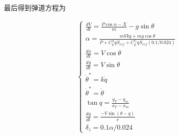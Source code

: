 \documentclass[UTF8]{ctexart}
\begin{document}
最后得到弹道方程为

\begin{align}
    \begin{cases}
        \frac{dV}{dt}=\frac{P\cos\alpha-X}{m}-g\sin\theta                                                     \\
        \alpha=\frac{mVk\dot{q}+mg\cos\theta}{P+C_{y}^{\alpha}qS_{ref}+C_{y}^{\delta_{z}}qS_{ref}(0.1/0.024)} \\
        \frac{dx}{dt}=V\cos\theta                                                                             \\
        {\frac{dy}{dt}}=V\sin\theta                                                                           \\
        \dot{\theta}^{*}=k\dot{q}                                                                             \\
        \dot{\theta}^{*}=\dot{\theta}                                                                         \\
        \tan q=\frac{y_{T}-y_{m}}{x_{T}-x_{m}}                                                                \\
        \frac{dq}{dt}=\frac{-V\sin(\theta-q)}{r}                                                              \\
        \delta_{z}=0.1\alpha/0.024
    \end{cases}
\end{align}




\clearpage


\clearpage


\end{document}
